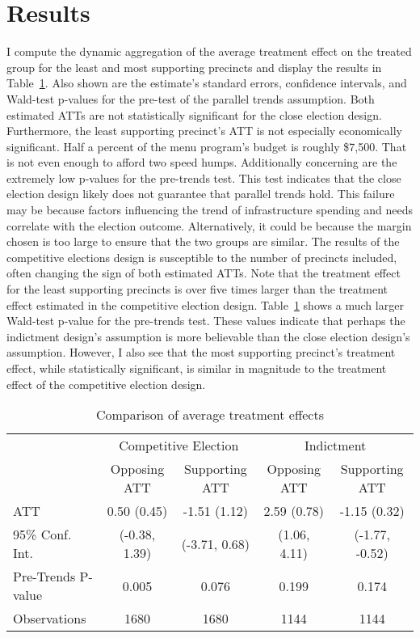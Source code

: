 \section{Results}\label{sec:results}


I compute the dynamic aggregation of the average treatment effect on the treated group for the least and most supporting precincts and display the results in Table~\ref{tab:att_comparison_combined}.
Also shown are the estimate's standard errors, confidence intervals, and Wald-test p-values for the pre-test of the parallel trends assumption.
Both estimated ATTs are not statistically significant for the close election design.
Furthermore, the least supporting precinct's ATT is not especially economically significant. 
Half a percent of the menu program's budget is roughly \$7,500. 
That is not even enough to afford two speed humps.
Additionally concerning are the extremely low p-values for the pre-trends test.
This test indicates that the close election design likely does not guarantee that parallel trends hold.
This failure may be because factors influencing the trend of infrastructure spending and needs correlate with the election outcome.
Alternatively, it could be because the margin chosen is too large to ensure that the two groups are similar.
The results of the competitive elections design is susceptible to the number of precincts included, often changing the sign of both estimated ATTs.
Note that the treatment effect for the least supporting precincts is over five times larger than the treatment effect estimated in the competitive election design.
Table~\ref{tab:att_comparison_combined} shows a much larger Wald-test p-value for the pre-trends test.
These values indicate that perhaps the indictment design's assumption is more believable than the close election design's assumption.
However, I also see that the most supporting precinct's treatment effect, while statistically significant, is similar in magnitude to the treatment effect of the competitive election design.

\begin{table}[H]
    \centering
    \caption{Comparison of average treatment effects}
    \label{tab:att_comparison_combined}
    \begin{tabular}{lcc|cc}
    \hline
     & \multicolumn{2}{c|}{Competitive Election} & \multicolumn{2}{c}{Indictment} \\
     & Opposing ATT & Supporting ATT & Opposing ATT & Supporting ATT \\
    \hline
    ATT & 0.50 (0.45) & -1.51 (1.12) & 2.59 (0.78) & -1.15 (0.32) \\
    95\% Conf. Int. & (-0.38, 1.39) & (-3.71, 0.68) & (1.06, 4.11) & (-1.77, -0.52) \\
    Pre-Trends P-value & 0.005  & 0.076 & 0.199 & 0.174 \\
    Observations & 1680 & 1680 & 1144 & 1144 \\
    \hline
    \end{tabular}
\end{table}

